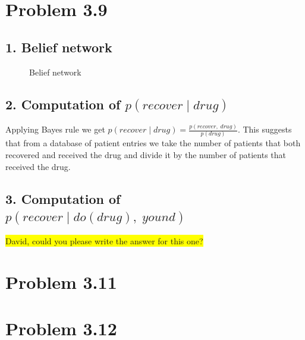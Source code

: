 \documentclass[11pt,a4paper,oneside]{report}
\newcommand{\hilight}[1]{\colorbox{yellow}{#1}}
\begin{document}
\section*{Problem 3.9}

\subsection*{1. Belief network}

\begin{figure}[H]
  \centering
    \caption{Belief network}
    \label{fig:all_trade_cca_black}     
\end{figure}

\subsection*{2. Computation of $p(recover \; | \; drug)$}

Applying Bayes rule we get $p(recover \; | \; drug) = \frac{p(recover, 
\;drug)}{p(drug)}$. This suggests that from a database of patient entries we 
take the number of patients that both recovered and received the drug and 
divide 
it by the number of patients that received the drug. 

\subsection*{3. Computation of $p(recover \; | \; do(drug),\; yound)$}

\hilight{David, could you please write the answer for this one?}

\section*{Problem 3.11}


\section*{Problem 3.12}
\end{document}
